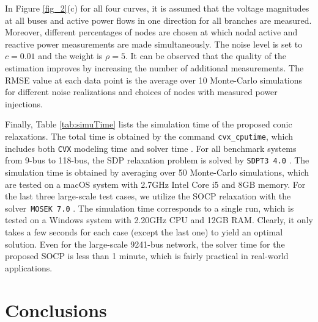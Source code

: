 \documentclass[journal,twoside]{IEEEtran}
\begin{document}
\begin{figure*}
	\centering
	\caption{The RMSEs of the estimated voltages obtained with  additional nodal power measurements: (a) $c=0.01$ and (b) $c=0.02$. Both are tested on PEGASE 1354-bus system using the penalized SDP;  (c) $c=0.01$ with PEGASE 9241-bus system using the penalized SOCP.}
	\label{fig_2}\vspace{-5mm}
\end{figure*}


In Figure \ref{fig_2}(c) for all four curves, it is assumed that the voltage magnitudes at all buses and active power flows in one direction for all branches are measured. Moreover, different percentages of nodes are chosen at which nodal active and reactive power measurements are made simultaneously.
The noise level is set to $c=0.01$ and the weight is $\rho = 5$. It can be observed that the quality of the estimation improves by increasing the number of additional measurements. The RMSE value at each data point is the average over 10 Monte-Carlo simulations for different noise realizations and choices of nodes with measured power injections.

Finally, Table \ref{tab:simuTime} lists the simulation time of the proposed conic relaxations. The total time is obtained by the command \texttt{cvx\_cputime}, which includes both \texttt{CVX} modeling time and solver time \cite{cvx}. For all benchmark systems from 9-bus to 118-bus, the SDP relaxation problem is solved by \texttt{SDPT3 4.0} \cite{sdpt3}. 
The simulation time is obtained by averaging over 50 Monte-Carlo simulations, which are tested on a macOS system with 2.7GHz Intel Core i5 and 8GB memory. For the last three large-scale test cases,  we utilize the SOCP relaxation with the solver~\texttt{MOSEK 7.0} \cite{mosek}. The simulation time corresponds to a single run, which is tested on a Windows system with 2.20GHz CPU and 12GB RAM. Clearly, it only takes a few seconds for each case (except the last one) to yield an optimal solution. Even for the large-scale 9241-bus network, the solver time for the proposed SOCP is less than 1 minute, which is fairly practical in real-world applications.



\section{Conclusions}\label{sec:Conclusions}
\end{document}
